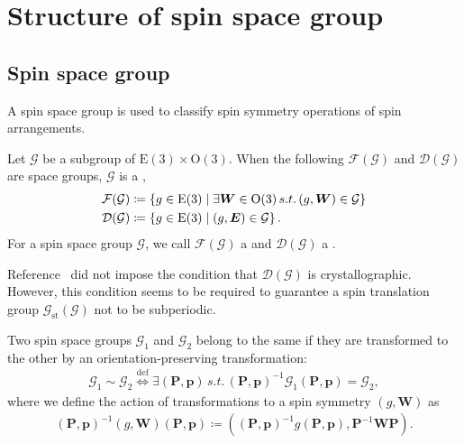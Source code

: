 \section{Structure of spin space group}

\subsection{Spin space group}

A spin space group \cite{doi:10.1063/1.1708514,doi:10.1098/rspa.1966.0211,LITVIN1974538,Opechowski1986} is used to classify spin symmetry operations of spin arrangements.

\begin{screen}
  \begin{definition}
    Let $\mathcal{G}$ be a subgroup of $\mathrm{E}(3) \times \mathrm{O}(3)$.
    When the following $\mathcal{F}(\mathcal{G})$ and $\mathcal{D}(\mathcal{G})$ are space groups, $\mathcal{G}$ is a  \cite{LITVIN1974538},
    \begin{align}
      \mathcal{F}(\mathcal{G})
        &\coloneqq \left\{  g \in \mathrm{E}(3)  \mathrel{}\middle|\mathrel{}  \exists \bm{W} \in \mathrm{O}(3) \,s.t.\, (g, \bm{W}) \in \mathcal{G}  \right\} \\
      \mathcal{D}(\mathcal{G})
        &\coloneqq \left\{  g \in \mathrm{E}(3)  \mathrel{}\middle|\mathrel{}  (g, \bm{E}) \in \mathcal{G}  \right\}.
    \end{align}
    For a spin space group $\mathcal{G}$, we call $\mathcal{F}(\mathcal{G})$ a  and $\mathcal{D}(\mathcal{G})$ a .
  \end{definition}
\end{screen}
Reference~\cite{LITVIN1974538} did not impose the condition that $\mathcal{D}(\mathcal{G})$ is crystallographic.
However, this condition seems to be required to guarantee a spin translation group $\mathcal{G}_{\mathrm{st}}(\mathcal{G})$ not to be subperiodic.

\begin{screen}
  \begin{definition}
    Two spin space groups $\mathcal{G}_{1}$ and $\mathcal{G}_{2}$ belong to the same  if they are transformed to the other by an orientation-preserving transformation:
    \begin{align}
      \mathcal{G}_{1} \sim \mathcal{G}_{2}
      \overset{\mathrm{def}}{\Longleftrightarrow}
      \exists (\bm{P}, \bm{p}) \,s.t.\, (\bm{P}, \bm{p})^{-1} \mathcal{G}_{1} (\bm{P}, \bm{p}) = \mathcal{G}_{2},
    \end{align}
    where we define the action of transformations to a spin symmetry $(g, \bm{W})$ as
    \begin{align}
      (\bm{P}, \bm{p})^{-1} (g, \bm{W}) (\bm{P}, \bm{p})
      \coloneqq
      ((\bm{P}, \bm{p})^{-1} g (\bm{P}, \bm{p}), \bm{P}^{-1}\bm{W}\bm{P}).
    \end{align}
  \end{definition}
\end{screen}

